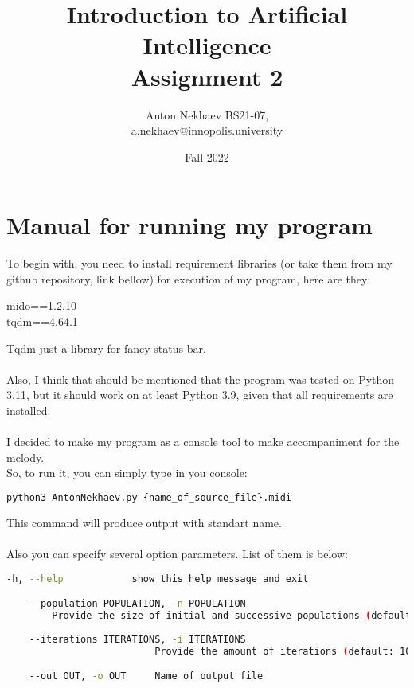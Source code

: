\documentclass[a4paper]{article}
\title{Introduction to Artificial Intelligence \\ Assignment 2}
\author{Anton Nekhaev BS21-07, \\ a.nekhaev@innopolis.university}
\date{Fall 2022}
\begin{document}
\maketitle

\section{Manual for running my program}
To begin with, you need to install requirement libraries (or take them from my github repository, link bellow) for execution of my program, here are they:
\begin{center}
    mido==1.2.10\\
    tqdm==4.64.1
\end{center}
Tqdm just a library for fancy status bar.\\ \\
Also, I think that should be mentioned that the program was tested on Python 3.11, but it should work on at least Python 3.9, given that all requirements are installed. \\ \\
I decided to make my program as a console tool to make accompaniment for the melody. \\
So, to run it, you can simply type in you console:
\begin{lstlisting}[language=bash]
    python3 AntonNekhaev.py {name_of_source_file}.midi
\end{lstlisting}
This command will produce output with standart name. \\
\\
Also you can specify several option parameters. List of them is below:
\begin{lstlisting}[language=bash,caption={Output of python3 AntonNekhaev.py \  -- -- help (optinal part)}]
    -h, --help            show this help message and exit

    --population POPULATION, -n POPULATION
        Provide the size of initial and successive populations (default: 600)
    
    --iterations ITERATIONS, -i ITERATIONS
                          Provide the amount of iterations (default: 100)

    --out OUT, -o OUT     Name of output file  
\end{lstlisting}
\end{document}
